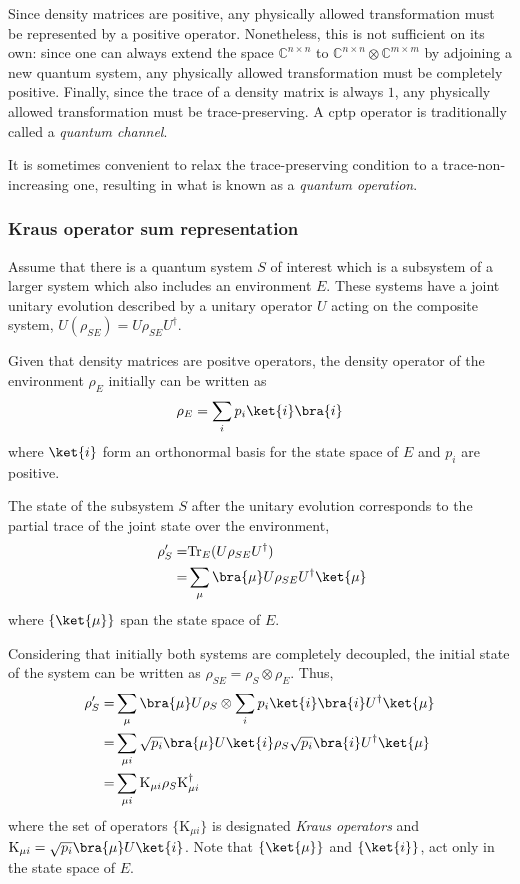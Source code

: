 Since density matrices are positive, any physically allowed transformation must be represented by a positive operator. Nonetheless, this is not sufficient on its own: since one can always extend the space $\mathbb{C}^{n \times n}$ to  $\mathbb{C}^{n \times n} \otimes \mathbb{C}^{m \times m} $ by adjoining a new quantum system, any physically allowed transformation must be completely positive. Finally, since the trace of a density matrix is always $1$, any physically allowed transformation must be trace-preserving. A \acrfull{cptp} operator is traditionally called a \emph{quantum channel}.

It is sometimes convenient to relax the trace-preserving condition to a trace-non-increasing one, resulting in what is known as a \emph{quantum operation}.








\subsubsection{Kraus operator sum representation}


Assume that there is a quantum system $S$ of interest which is a subsystem of a larger system which also includes an environment $E$. These systems have a joint unitary evolution described by a unitary operator $U$ acting on the composite system, $U (\rho_{SE} )= U \rho_{SE} U^{\dag}$. 

Given that density matrices are positve operators, the density operator of the environment $\rho_E$ initially can be written as 
\begin{equation*}
  \rho_E = \sum_{i} p_{i} \ket{i} \bra{i}
\end{equation*}
where $\ket{i}$ form an orthonormal basis for the state space of $E$ and $p_{i}$ are positive. 

The state of the subsystem $S$ after the unitary evolution corresponds to the partial trace of the joint state over the environment,
\begin{align*}
  \rho_{S}' = & \text{Tr}_{E}(U \rho_{SE} U^{\dag}) \\
 = & \sum_{\mu} \bra{\mu} U \rho_{SE} U^{\dag} \ket{\mu}
\end{align*}
where $\{\ket{\mu}\}$ span the state space of $E$.

 
Considering that initially both systems are completely decoupled, the initial state of the system can be written as $ \rho_{SE} = \rho_{S} \otimes \rho_{E}$. Thus,
\begin{align*} 
  \rho_{S}' = & \sum_{\mu} \bra{\mu} U \rho_{S} \otimes \sum_{i} p_{i} \ket{i} \bra{i} U^{\dag} \ket{\mu} \\
  = & \sum_{\mu i}  \sqrt{p_{i}} \bra{\mu} U \ket{i} \rho_{S} \sqrt{p_{i}} \bra{i} U^{\dag} \ket{\mu}  \\ 
  = & \sum_{\mu i} \text{K}_{\mu i} \rho_{S} \text{K}_{\mu i}^{\dag}
\end{align*}
where the set of operators $\{\text{K}_{\mu i}\}$ is designated \emph{Kraus operators} and $\text{K}_{\mu i} = \sqrt{p_{i}} \bra{\mu} U \ket{i}$. Note that $\{\ket{\mu}\}$ and $\{\ket{i}\}$, act only in the state space of $E$. 

